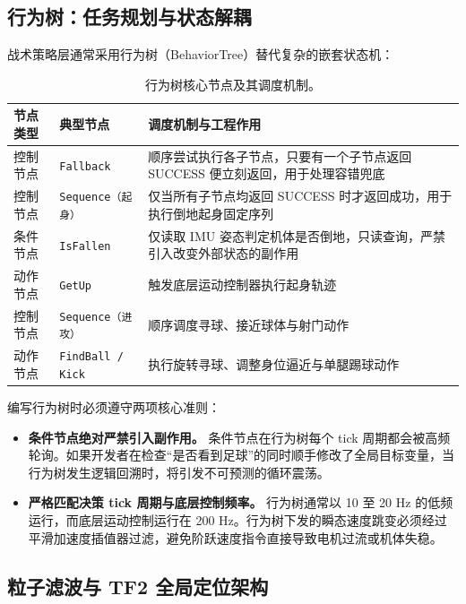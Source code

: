 \subsection{行为树：任务规划与状态解耦}

战术策略层通常采用行为树（BehaviorTree）替代复杂的嵌套状态机：

\begin{table}[H]
\centering
\small
\begin{tabularx}{\textwidth}{p{2.4cm} p{3.2cm} X}
\toprule
\textbf{节点类型} & \textbf{典型节点} & \textbf{调度机制与工程作用} \\
\midrule
控制节点 & \texttt{Fallback} & 顺序尝试执行各子节点，只要有一个子节点返回 SUCCESS 便立刻返回，用于处理容错兜底 \\
\addlinespace
控制节点 & \texttt{Sequence（起身）} & 仅当所有子节点均返回 SUCCESS 时才返回成功，用于执行倒地起身固定序列 \\
\addlinespace
条件节点 & \texttt{IsFallen} & 仅读取 IMU 姿态判定机体是否倒地，只读查询，严禁引入改变外部状态的副作用 \\
\addlinespace
动作节点 & \texttt{GetUp} & 触发底层运动控制器执行起身轨迹 \\
\addlinespace
控制节点 & \texttt{Sequence（进攻）} & 顺序调度寻球、接近球体与射门动作 \\
\addlinespace
动作节点 & \texttt{FindBall / Kick} & 执行旋转寻球、调整身位逼近与单腿踢球动作 \\
\bottomrule
\end{tabularx}
\caption{行为树核心节点及其调度机制。}
\end{table}

编写行为树时必须遵守两项核心准则：
\begin{itemize}[leftmargin=*]
    \item \textbf{条件节点绝对严禁引入副作用。} 条件节点在行为树每个 tick 周期都会被高频轮询。如果开发者在检查“是否看到足球”的同时顺手修改了全局目标变量，当行为树发生逻辑回溯时，将引发不可预测的循环震荡。
    \item \textbf{严格匹配决策 tick 周期与底层控制频率。} 行为树通常以 10 至 20 Hz 的低频运行，而底层运动控制运行在 200 Hz。行为树下发的瞬态速度跳变必须经过平滑加速度插值器过滤，避免阶跃速度指令直接导致电机过流或机体失稳。
\end{itemize}

\subsection{粒子滤波与 TF2 全局定位架构}

